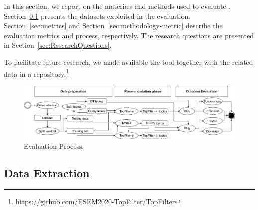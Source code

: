 





In this section, we report on the materials and methods used to evaluate \TF. %
Section~\ref{sec:Dataset} presents the datasets exploited in the evaluation.   
Section~\ref{sec:metrics} and Section~\ref{sec:methodology-metric} describe the 
evaluation metrics and process, respectively. The research questions 
are presented in Section~\ref{sec:ResearchQuestions}.

To facilitate future research, we made available the \TF tool together with the related data in a \GH repository.\footnote{\url{https://github.com/ESEM2020-TopFilter/TopFilter}}


\begin{figure}[h!]
	\centering
	\includegraphics[width=0.9\linewidth,keepaspectratio]{figs/evaluationCF.pdf}
	\caption{Evaluation Process.}
	\label{fig:EvaluationProcess}
	\vspace{-.3cm}
\end{figure}

\subsection{Data Extraction} \label{sec:Dataset}








